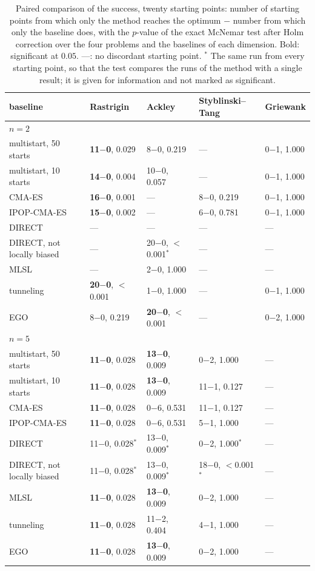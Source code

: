 \begin{table}[t]
  \centering
  \caption{Paired comparison of the success, twenty starting points:
    number of starting points from which only the method reaches the
    optimum $-$ number from which only the baseline does, with the
    $p$-value of the exact McNemar test after Holm correction over the
    four problems and the baselines of each dimension. Bold: significant
    at $0.05$. ---: no discordant starting point. $^\ast$ The same run
    from every starting point, so that the test compares the runs of the
    method with a single result; it is given for information and not
    marked as significant.}
  \label{tab:tests}
  \scriptsize
  \setlength{\tabcolsep}{3pt}
  \begin{tabular}{lllll}
    \toprule
    baseline & Rastrigin & Ackley & Styblinski--Tang & Griewank \\
    \midrule
    \multicolumn{5}{l}{$n = 2$} \\
    multistart, 50 starts & \textbf{11$-$0}, 0.029 & 8$-$0, 0.219 & --- & 0$-$1, 1.000 \\
    multistart, 10 starts & \textbf{14$-$0}, 0.004 & 10$-$0, 0.057 & --- & 0$-$1, 1.000 \\
    CMA-ES & \textbf{16$-$0}, 0.001 & --- & 8$-$0, 0.219 & 0$-$1, 1.000 \\
    IPOP-CMA-ES & \textbf{15$-$0}, 0.002 & --- & 6$-$0, 0.781 & 0$-$1, 1.000 \\
    DIRECT & --- & --- & --- & --- \\
    DIRECT, not locally biased & --- & 20$-$0, $<$0.001$^\ast$ & --- & --- \\
    MLSL & --- & 2$-$0, 1.000 & --- & --- \\
    tunneling & \textbf{20$-$0}, $<$0.001 & 1$-$0, 1.000 & --- & 0$-$1, 1.000 \\
    EGO & 8$-$0, 0.219 & \textbf{20$-$0}, $<$0.001 & --- & 0$-$2, 1.000 \\
    \midrule
    \multicolumn{5}{l}{$n = 5$} \\
    multistart, 50 starts & \textbf{11$-$0}, 0.028 & \textbf{13$-$0}, 0.009 & 0$-$2, 1.000 & --- \\
    multistart, 10 starts & \textbf{11$-$0}, 0.028 & \textbf{13$-$0}, 0.009 & 11$-$1, 0.127 & --- \\
    CMA-ES & \textbf{11$-$0}, 0.028 & 0$-$6, 0.531 & 11$-$1, 0.127 & --- \\
    IPOP-CMA-ES & \textbf{11$-$0}, 0.028 & 0$-$6, 0.531 & 5$-$1, 1.000 & --- \\
    DIRECT & 11$-$0, 0.028$^\ast$ & 13$-$0, 0.009$^\ast$ & 0$-$2, 1.000$^\ast$ & --- \\
    DIRECT, not locally biased & 11$-$0, 0.028$^\ast$ & 13$-$0, 0.009$^\ast$ & 18$-$0, $<$0.001$^\ast$ & --- \\
    MLSL & \textbf{11$-$0}, 0.028 & \textbf{13$-$0}, 0.009 & 0$-$2, 1.000 & --- \\
    tunneling & \textbf{11$-$0}, 0.028 & 11$-$2, 0.404 & 4$-$1, 1.000 & --- \\
    EGO & \textbf{11$-$0}, 0.028 & \textbf{13$-$0}, 0.009 & 0$-$2, 1.000 & --- \\
    \bottomrule
  \end{tabular}
\end{table}
